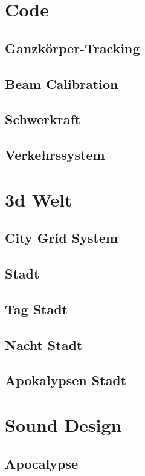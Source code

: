 \section{Code}\label{sec:code}
\subsection{Ganzkörper-Tracking}\label{sec:full-body-tracking}
\subsection{Beam Calibration}\label{subsec:beam-calibration}
\subsection{Schwerkraft}\label{subsec:gravity}
\subsection{Verkehrssystem}\label{subsec:traffic-system}
\section{3d Welt}\label{sec:3d-world}
\subsection{City Grid System}\label{subsec:city-grid-system}
\subsection{Stadt}\label{subsec:city}
\subsection{Tag Stadt}\label{subsec:day-city}
\subsection{Nacht Stadt}\label{subsec:night-city}
\subsection{Apokalypsen Stadt}\label{subsec:apocalypse-city}
\section{Sound Design}\label{sec:sound}
\subsection{Apocalypse}\label{subsec:apocalypse-background-sound}

